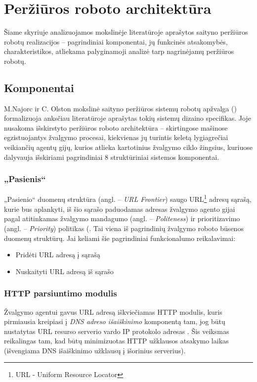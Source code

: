 \section{Peržiūros roboto architektūra}

Šiame skyriuje analizuojamos mokslinėje literatūroje aprašytos saityno peržiūros robotų realizacijos -- pagrindiniai komponentai, jų funkcinės atsakomybės, charakteristikos, atliekama palyginamoji analizė tarp nagrinėjamų peržiūros robotų.

\subsection{Komponentai}

M.Najorc ir C. Olston mokslinė saityno peržiūros sistemų robotų apžvalga (\cite{StanfWebCrawl}) formalizuoja anksčiau literatūroje aprašytas tokių sistemų dizaino specifikas. Joje nusakoma išskirstyto peržiūros roboto architektūra -- skirtingose mašinose egzistuojantys žvalgymo procesai, kiekvienas jų turintis keletą lygiagrečiai veikiančių agentų gijų, kurios atlieka kartotinius žvalgymo ciklo žingsius, kuriuose dalyvauja išskiriami pagrindiniai 8 struktūriniai sistemos komponentai.

\subsubsection{„Pasienis“}

„Pasienio“ duomenų struktūra (angl. -- \textit{URL Frontier}) saugo URL\footnote{URL - Uniform Resource Locator} adresų sąrašą, kurie bus aplankyti, iš šio sąrašo paduodamas adresas žvalgymo agento gijai pagal atitinkamas žvalgymo mandagumo (angl. -- \textit{Politeness}) ir prioritizavimo (angl. -- \textit{Priority}) politikas (\cite{StanfWebCrawl}. Tai viena iš pagrindinių žvalgymo roboto būsenos duomenų struktūrų. Jai keliami šie pagrindiniai funkcionalumo reikalavimai:
\begin{itemize}
    \item Pridėti URL adresą į sąrašą
    \item Nuskaityti URL adresą iš sąrašo
\end{itemize}

\subsubsection{HTTP parsiuntimo modulis}

Žvalgymo agentui gavus URL adresą iškviečiamas HTTP modulis, kuris pirmiausia kreipiasi į \textit{DNS adreso išaiškinimo} komponentą tam, jog būtų nustatytas URL resurso serverio vardo IP protokolo adresas \cite{StanfWebCrawl}. Šis veiksmas reikalingas tam, kad būtų minimizuotas HTTP užklausos atsakymo laikas (išvengiama DNS išaiškinimo užklausų į išorinius serverius).

